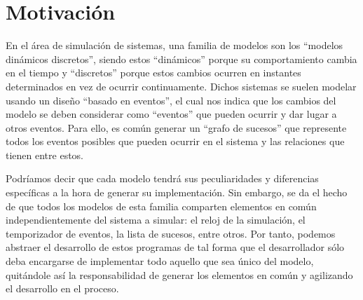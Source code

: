 \section{Motivación}\label{sec:motivacion}

En el área de simulación de sistemas, una familia de modelos son los “modelos
dinámicos discretos”, siendo estos “dinámicos” porque su comportamiento cambia
en el tiempo y “discretos” porque estos cambios ocurren en instantes
determinados en vez de ocurrir continuamente.
Dichos sistemas se suelen modelar usando un diseño “basado en eventos”, el cual
nos indica que los cambios del modelo se deben considerar como “eventos” que
pueden ocurrir y dar lugar a otros eventos. Para ello, es común generar un
“grafo de sucesos” que represente todos los eventos posibles que pueden ocurrir
en el sistema y las relaciones que tienen entre estos.

Podríamos decir que cada modelo tendrá sus peculiaridades y diferencias
específicas a la hora de generar su implementación. Sin embargo, se da el hecho
de que todos los modelos de esta familia comparten elementos en común
independientemente del sistema a simular: el reloj de la simulación, el
temporizador de eventos, la lista de sucesos, entre otros. Por tanto, podemos
abstraer el desarrollo de estos programas de tal forma que el desarrollador sólo
deba encargarse de implementar todo aquello que sea único del modelo, quitándole
así la responsabilidad de generar los elementos en común y agilizando el
desarrollo en el proceso.




